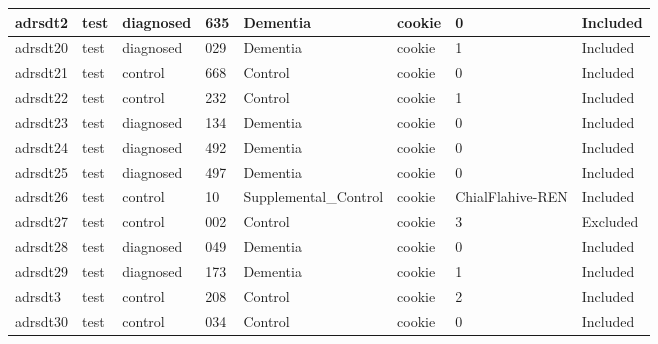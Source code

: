 \begin{center}
\begin{longtable}{|l|l|l|l|l|l|l|l|}
adrsdt2        & test                  & diagnosed         & 635                & Dementia             & cookie          & 0                & Included      \\ \hline
adrsdt20       & test                  & diagnosed         & 029                & Dementia             & cookie          & 1                & Included      \\ \hline
adrsdt21       & test                  & control           & 668                & Control              & cookie          & 0                & Included      \\ \hline
adrsdt22       & test                  & control           & 232                & Control              & cookie          & 1                & Included      \\ \hline
adrsdt23       & test                  & diagnosed         & 134                & Dementia             & cookie          & 0                & Included      \\ \hline
adrsdt24       & test                  & diagnosed         & 492                & Dementia             & cookie          & 0                & Included      \\ \hline
adrsdt25       & test                  & diagnosed         & 497                & Dementia             & cookie          & 0                & Included      \\ \hline
adrsdt26       & test                  & control           & 10                 & Supplemental\_Control & cookie          & ChialFlahive-REN & Included      \\ \hline
adrsdt27       & test                  & control           & 002                & Control              & cookie          & 3                & Excluded      \\ \hline
adrsdt28       & test                  & diagnosed         & 049                & Dementia             & cookie          & 0                & Included      \\ \hline
adrsdt29       & test                  & diagnosed         & 173                & Dementia             & cookie          & 1                & Included      \\ \hline
adrsdt3        & test                  & control           & 208                & Control              & cookie          & 2                & Included      \\ \hline
adrsdt30       & test                  & control           & 034                & Control              & cookie          & 0                & Included      \\ \hline

\end{longtable}
\end{center}
